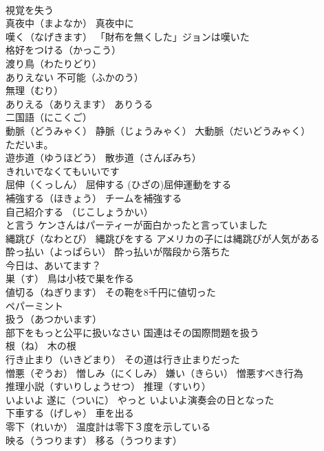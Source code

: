 \documentclass[8pt]{extreport}
\begin{document}
\begin{CJK}{UTF8}{min}
\\	視覚を失う
\\	真夜中（まよなか） 真夜中に
\\	嘆く（なげきます） 「財布を無くした」ジョンは嘆いた
\\	格好をつける（かっこう）
\\	渡り鳥（わたりどり）
\\	ありえない 不可能（ふかのう）
\\	無理（むり）
\\	ありえる（ありえます） ありうる
\\	二国語（にこくご）
\\	動脈（どうみゃく） 静脈（じょうみゃく） 大動脈（だいどうみゃく）
\\	ただいま。
\\	遊歩道（ゆうほどう） 散歩道（さんぽみち）
\\	きれいでなくてもいいです
\\	屈伸（くっしん） 屈伸する (ひざの)屈伸運動をする
\\	補強する（ほきょう） チームを補強する
\\	自己紹介する （じこしょうかい）
\\	と言う ケンさんはパーティーが面白かったと言っていました
\\	縄跳び（なわとび） 縄跳びをする アメリカの子には縄跳びが人気がある
\\	酔っ払い（よっぱらい） 酔っ払いが階段から落ちた
\\	今日は、あいてます？
\\	巣（す） 鳥は小枝で巣を作る
\\	値切る（ねぎります） その鞄を8千円に値切った
\\	ペパーミント
\\	扱う（あつかいます） 
\\	部下をもっと公平に扱いなさい 国連はその国際問題を扱う
\\	根（ね） 木の根
\\	行き止まり（いきどまり） その道は行き止まりだった
\\	憎悪（ぞうお） 憎しみ（にくしみ） 嫌い（きらい） 憎悪すべき行為
\\	推理小説（すいりしょうせつ） 推理（すいり）
\\	いよいよ 遂に（ついに） やっと いよいよ演奏会の日となった
\\	下車する（げしゃ） 車を出る
\\	零下（れいか） 温度計は零下３度を示している
\\	映る（うつります） 移る（うつります）

\end{CJK}
\end{document}
